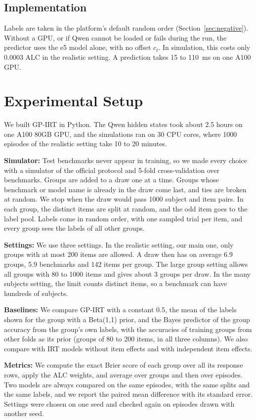\documentclass{article}
\begin{document}
\subsection{Implementation}
Labels are taken in the platform's default random order (Section~\ref{sec:negative}). Without a GPU, or if Qwen cannot
be loaded or fails during the run, the predictor uses the e5 model alone, with no offset $c_t$. In simulation, this
costs only 0.0003 ALC in the realistic setting. A prediction takes 15 to 110~ms on one A100 GPU.

\section{Experimental Setup}\label{sec:sim}
We built GP-IRT in Python. The Qwen hidden states took about 2.5 hours on one A100 80GB GPU, and the simulations ran
on 30 CPU cores, where 1000 episodes of the realistic setting take 10 to 20 minutes.

\textbf{Simulator:} Test benchmarks never appear in training, so we made every choice with a simulator of the official
protocol and 5-fold cross-validation over benchmarks. Groups are added to a draw one at a time. Groups whose benchmark
or model name is already in the draw come last, and ties are broken at random. We stop when the draw would pass 1000
subject and item pairs. In each group, the distinct items are split at random, and the odd item goes to the label
pool. Labels come in random order, with one sampled trial per item, and every group sees the labels of all other
groups.

\textbf{Settings:} We use three settings. In the realistic setting, our main one, only groups with at most 200 items
are allowed. A draw then has on average 6.9 groups, 5.9 benchmarks and 142 items per group. The large group setting
allows all groups with 80 to 1000 items and gives about 3 groups per draw. In the many subjects setting, the limit
counts distinct items, so a benchmark can have hundreds of subjects.

\textbf{Baselines:} We compare GP-IRT with a constant 0.5, the mean of the labels shown for the group with a
Beta(1,1) prior, and the Bayes predictor of the group accuracy from the group's own labels, with the accuracies of
training groups from other folds as its prior (groups of 80 to 200 items, in all three columns). We also compare with
IRT models without item effects and with independent item effects.

\textbf{Metrics:} We compute the exact Brier score of each group over all its response rows, apply the ALC weights,
and average over groups and then over episodes. Two models are always compared on the same episodes, with the same
splits and the same labels, and we report the paired mean difference with its standard error. Settings were chosen on
one seed and checked again on episodes drawn with another seed.
\end{document}
